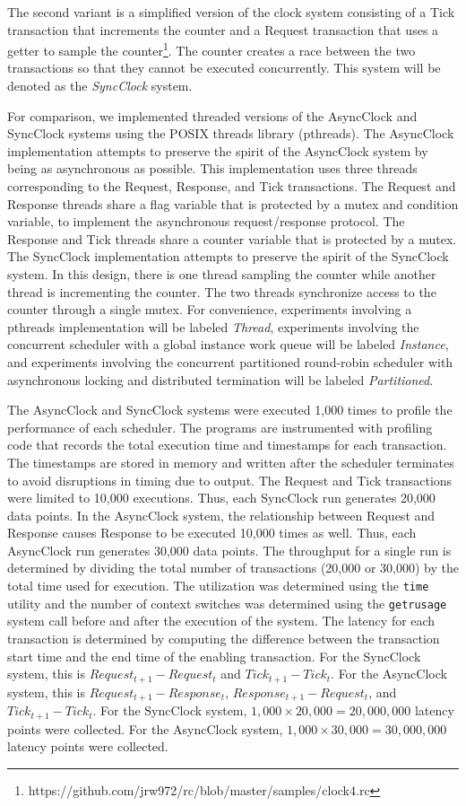 The second variant is a simplified version of the clock system consisting of a Tick transaction that increments the counter and a Request transaction that uses a getter to sample the counter\footnote{https://github.com/jrw972/rc/blob/master/samples/clock4.rc}.
The counter creates a race between the two transactions so that they cannot be executed concurrently.
This system will be denoted as the \emph{SyncClock} system.

For comparison, we implemented threaded versions of the AsyncClock and SyncClock systems using the POSIX threads library (pthreads).
The AsyncClock implementation attempts to preserve the spirit of the AsyncClock system by being as asynchronous as possible.
This implementation uses three threads corresponding to the Request, Response, and Tick transactions.
The Request and Response threads share a flag variable that is protected by a mutex and condition variable, to implement the asynchronous request/response protocol.
The Response and Tick threads share a counter variable that is protected by a mutex.
The SyncClock implementation attempts to preserve the spirit of the SyncClock system.
In this design, there is one thread sampling the counter while another thread is incrementing the counter.
The two threads synchronize access to the counter through a single mutex.
For convenience, experiments involving a pthreads implementation will be labeled \emph{Thread}, experiments involving the concurrent scheduler with a global instance work queue will be labeled \emph{Instance}, and experiments involving the concurrent partitioned  round-robin scheduler with asynchronous locking and distributed termination will be labeled \emph{Partitioned}.

The AsyncClock and SyncClock systems were executed 1,000 times to profile the performance of each scheduler.
The programs are instrumented with profiling code that records the total execution time and timestamps for each transaction.
The timestamps are stored in memory and written after the scheduler terminates to avoid disruptions in timing due to output.
The Request and Tick transactions were limited to 10,000 executions.
Thus, each SyncClock run generates 20,000 data points.
In the AsyncClock system, the relationship between Request and Response causes Response to be executed 10,000 times as well.
Thus, each AsyncClock run generates 30,000 data points.
The throughput for a single run is determined by dividing the total number of transactions (20,000 or 30,000) by the total time used for execution.
The utilization was determined using the \verb+time+ utility and the number of context switches was determined using the \verb+getrusage+ system call before and after the execution of the system.
The latency for each transaction is determined by computing the difference between the transaction start time and the end time of the enabling transaction.
For the SyncClock system, this is $Request_{t+1} - Request_{t}$ and $Tick_{t+1} - Tick_{t}$.
For the AsyncClock system, this is $Request_{t+1} - Response_{t}$, $Response_{t+1} - Request_{t}$, and $Tick_{t+1} - Tick_{t}$.
For the SyncClock system, $1,000 \times 20,000 = 20,000,000$ latency points were collected.
For the AsyncClock system, $1,000 \times 30,000 = 30,000,000$ latency points were collected.

